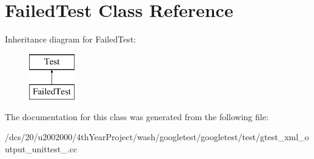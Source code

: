 \hypertarget{classFailedTest}{}\section{Failed\+Test Class Reference}
\label{classFailedTest}
Inheritance diagram for Failed\+Test\+:\begin{figure}[H]
\begin{center}
\leavevmode
\includegraphics[height=2.000000cm]{classFailedTest}
\end{center}
\end{figure}


The documentation for this class was generated from the following file\+:\begin{DoxyCompactItemize}
\item 
/dcs/20/u2002000/4th\+Year\+Project/wash/googletest/googletest/test/gtest\+\_\+xml\+\_\+output\+\_\+unittest\+\_\+.\+cc\end{DoxyCompactItemize}
